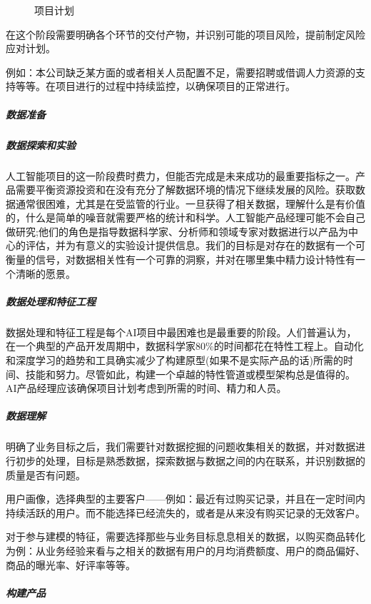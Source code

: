 \documentclass[letterpaper,11pt,english]{sphinxmanual}
\begin{document}
\begin{figure}[H]
\centering
\capstart

\noindent{}
\caption{项目计划}\label{\detokenize{chapter_project/process:id36}}\end{figure}

在这个阶段需要明确各个环节的交付产物，并识别可能的项目风险，提前制定风险应对计划。

例如：本公司缺乏某方面的或者相关人员配置不足，需要招聘或借调人力资源的支持等等。在项目进行的过程中持续监控，以确保项目的正常进行。


\subparagraph{数据准备}
\label{\detokenize{chapter_project/process:id18}}

\subparagraph{数据探索和实验}
\label{\detokenize{chapter_project/process:id19}}
人工智能项目的这一阶段费时费力，但能否完成是未来成功的最重要指标之一。产品需要平衡资源投资和在没有充分了解数据环境的情况下继续发展的风险。获取数据通常很困难，尤其是在受监管的行业。一旦获得了相关数据，理解什么是有价值的，什么是简单的噪音就需要严格的统计和科学。人工智能产品经理可能不会自己做研究;他们的角色是指导数据科学家、分析师和领域专家对数据进行以产品为中心的评估，并为有意义的实验设计提供信息。我们的目标是对存在的数据有一个可衡量的信号，对数据相关性有一个可靠的洞察，并对在哪里集中精力设计特性有一个清晰的愿景。


\subparagraph{数据处理和特征工程}
\label{\detokenize{chapter_project/process:id20}}
数据处理和特征工程是每个AI项目中最困难也是最重要的阶段。人们普遍认为，在一个典型的产品开发周期中，数据科学家80\%的时间都花在特性工程上。自动化和深度学习的趋势和工具确实减少了构建原型(如果不是实际产品的话)所需的时间、技能和努力。尽管如此，构建一个卓越的特性管道或模型架构总是值得的。AI产品经理应该确保项目计划考虑到所需的时间、精力和人员。


\subparagraph{数据理解}
\label{\detokenize{chapter_project/process:id21}}
明确了业务目标之后，我们需要针对数据挖掘的问题收集相关的数据，并对数据进行初步的处理，目标是熟悉数据，探索数据与数据之间的内在联系，并识别数据的质量是否有问题。

用户画像，选择典型的主要客户——例如：最近有过购买记录，并且在一定时间内持续活跃的用户。而不能选择已经流失的，或者是从来没有购买记录的无效客户。

对于参与建模的特征，需要选择那些与业务目标息息相关的数据，以购买商品转化为例：从业务经验来看与之相关的数据有用户的月均消费额度、用户的商品偏好、商品的曝光率、好评率等等。


\subparagraph{构建产品}
\label{\detokenize{chapter_project/process:id22}}
\end{document}
